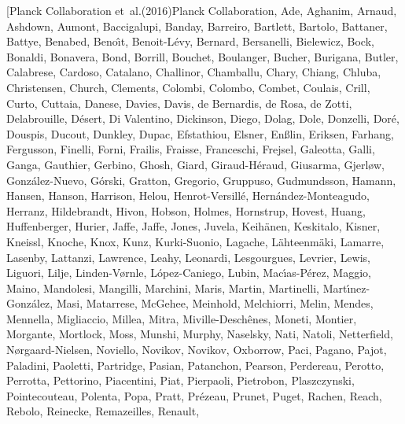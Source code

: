 \documentclass[twocolumn,linenumbers]{aastex63}
\begin{document}
\begin{thebibliography}{}
\bibitem[{{Planck Collaboration} {et~al.}(2016){Planck Collaboration}, {Ade},
  {Aghanim}, {Arnaud}, {Ashdown}, {Aumont}, {Baccigalupi}, {Banday},
  {Barreiro}, {Bartlett}, {Bartolo}, {Battaner}, {Battye}, {Benabed},
  {Beno{\^\i}t}, {Benoit-L{\'e}vy}, {Bernard}, {Bersanelli}, {Bielewicz},
  {Bock}, {Bonaldi}, {Bonavera}, {Bond}, {Borrill}, {Bouchet}, {Boulanger},
  {Bucher}, {Burigana}, {Butler}, {Calabrese}, {Cardoso}, {Catalano},
  {Challinor}, {Chamballu}, {Chary}, {Chiang}, {Chluba}, {Christensen},
  {Church}, {Clements}, {Colombi}, {Colombo}, {Combet}, {Coulais}, {Crill},
  {Curto}, {Cuttaia}, {Danese}, {Davies}, {Davis}, {de Bernardis}, {de Rosa},
  {de Zotti}, {Delabrouille}, {D{\'e}sert}, {Di Valentino}, {Dickinson},
  {Diego}, {Dolag}, {Dole}, {Donzelli}, {Dor{\'e}}, {Douspis}, {Ducout},
  {Dunkley}, {Dupac}, {Efstathiou}, {Elsner}, {En{\ss}lin}, {Eriksen},
  {Farhang}, {Fergusson}, {Finelli}, {Forni}, {Frailis}, {Fraisse},
  {Franceschi}, {Frejsel}, {Galeotta}, {Galli}, {Ganga}, {Gauthier}, {Gerbino},
  {Ghosh}, {Giard}, {Giraud-H{\'e}raud}, {Giusarma}, {Gjerl{\o}w},
  {Gonz{\'a}lez-Nuevo}, {G{\'o}rski}, {Gratton}, {Gregorio}, {Gruppuso},
  {Gudmundsson}, {Hamann}, {Hansen}, {Hanson}, {Harrison}, {Helou},
  {Henrot-Versill{\'e}}, {Hern{\'a}ndez-Monteagudo}, {Herranz}, {Hildebrandt},
  {Hivon}, {Hobson}, {Holmes}, {Hornstrup}, {Hovest}, {Huang}, {Huffenberger},
  {Hurier}, {Jaffe}, {Jaffe}, {Jones}, {Juvela}, {Keih{\"a}nen}, {Keskitalo},
  {Kisner}, {Kneissl}, {Knoche}, {Knox}, {Kunz}, {Kurki-Suonio}, {Lagache},
  {L{\"a}hteenm{\"a}ki}, {Lamarre}, {Lasenby}, {Lattanzi}, {Lawrence}, {Leahy},
  {Leonardi}, {Lesgourgues}, {Levrier}, {Lewis}, {Liguori}, {Lilje},
  {Linden-V{\o}rnle}, {L{\'o}pez-Caniego}, {Lubin}, {Mac{\'\i}as-P{\'e}rez},
  {Maggio}, {Maino}, {Mandolesi}, {Mangilli}, {Marchini}, {Maris}, {Martin},
  {Martinelli}, {Mart{\'\i}nez-Gonz{\'a}lez}, {Masi}, {Matarrese}, {McGehee},
  {Meinhold}, {Melchiorri}, {Melin}, {Mendes}, {Mennella}, {Migliaccio},
  {Millea}, {Mitra}, {Miville-Desch{\^e}nes}, {Moneti}, {Montier}, {Morgante},
  {Mortlock}, {Moss}, {Munshi}, {Murphy}, {Naselsky}, {Nati}, {Natoli},
  {Netterfield}, {N{\o}rgaard-Nielsen}, {Noviello}, {Novikov}, {Novikov},
  {Oxborrow}, {Paci}, {Pagano}, {Pajot}, {Paladini}, {Paoletti}, {Partridge},
  {Pasian}, {Patanchon}, {Pearson}, {Perdereau}, {Perotto}, {Perrotta},
  {Pettorino}, {Piacentini}, {Piat}, {Pierpaoli}, {Pietrobon}, {Plaszczynski},
  {Pointecouteau}, {Polenta}, {Popa}, {Pratt}, {Pr{\'e}zeau}, {Prunet},
  {Puget}, {Rachen}, {Reach}, {Rebolo}, {Reinecke}, {Remazeilles}, {Renault},
}
\end{thebibliography}
\end{document}
